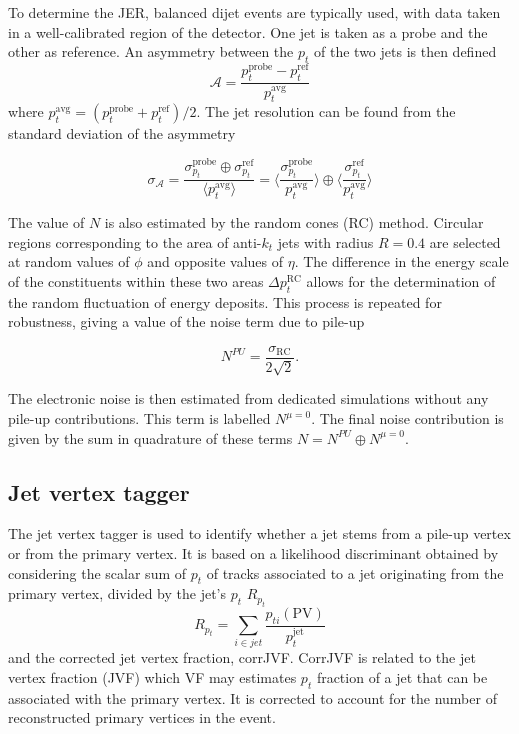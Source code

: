 \documentclass[10pt,a4paper]{book}
\begin{document}
To determine the JER, balanced dijet events are typically used, with data taken in a well-calibrated region of the detector. One jet is taken as a probe and the other as reference. An asymmetry between the $p_t$ of the two jets is then defined
\begin{equation}
    \mathcal{A} = \frac{p_t^{\text{probe}} - p_t^{\text{ref}}}{p_t^{\text{avg}}}
\end{equation}
where $p_t^{\text{avg}} = (p_t^{\text{probe}} + p_t^{\text{ref}})/2$. The jet resolution can be found from the standard deviation of the asymmetry

\begin{equation}
    \sigma_\mathcal{A} = \frac{\sigma_{p_t}^\text{probe} \oplus \sigma_{p_t}^\text{ref}}{\langle p_t^{\text{avg}}\rangle} = \biggl \langle \frac{\sigma_{p_t}^\text{probe}}{p_t^{\text{avg}}} \biggl \rangle \oplus \biggl \langle\frac{\sigma_{p_t}^\text{ref}}{p_t^{\text{avg}}} \biggl \rangle
\end{equation}

The value of $N$ is also estimated by the random cones (RC) method. Circular regions corresponding to the area of anti-$k_t$ jets with radius $R=0.4$ are selected at random values of $\phi$ and opposite values of $\eta$. The difference in the energy scale of the constituents within these two areas $\Delta p_t^{\text{RC}}$ allows for the determination of the random fluctuation of energy deposits. This process is repeated for robustness, giving a value of the noise term due to pile-up

\begin{equation}
    N^{PU} = \frac{\sigma_{\text{RC}}}{2\sqrt{2}}.
\end{equation}

The electronic noise is then estimated from dedicated simulations without any pile-up contributions. This term is labelled $N^{\mu = 0}$. The final noise contribution is given by the sum in quadrature of these terms $N = N^{PU} \oplus N^{\mu=0}$.

\subsection{Jet vertex tagger}
The jet vertex tagger is used to identify whether a jet stems from a pile-up vertex or from the primary vertex. It is based on a likelihood discriminant obtained by considering the scalar sum of $p_t$ of tracks associated to a jet originating from the primary vertex, divided by the jet's $p_t$ $R_{p_t}$
\begin{equation}
    R_{p_t} = \sum_{i\in jet}\frac{p_{ti}(\text{PV})}{p_t^{\text{jet}}}
\end{equation}
and the corrected jet vertex fraction, corrJVF. CorrJVF is related to the jet vertex fraction (JVF) which VF may estimates $p_t$ fraction of a jet that can be associated with the primary vertex. It is corrected to account for the number of reconstructed primary vertices in the event.
\end{document}
